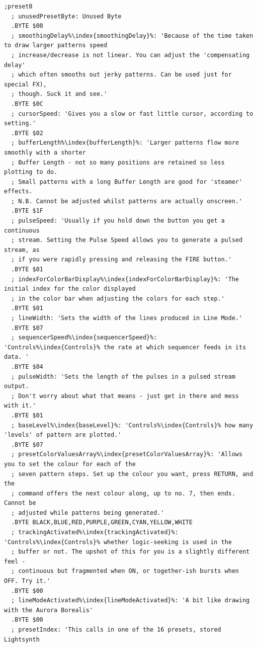 \begin{lstlisting}[basicstyle=\ttfamily\scriptsize,caption=Data structure for Preset 0.,escapechar=\%]
;preset0
  ; unusedPresetByte: Unused Byte
  .BYTE $00
  ; smoothingDelay%\index{smoothingDelay}%: 'Because of the time taken to draw larger patterns speed
  ; increase/decrease is not linear. You can adjust the 'compensating delay'
  ; which often smooths out jerky patterns. Can be used just for special FX),
  ; though. Suck it and see.'
  .BYTE $0C
  ; cursorSpeed: 'Gives you a slow or fast little cursor, according to setting.'
  .BYTE $02
  ; bufferLength%\index{bufferLength}%: 'Larger patterns flow more smoothly with a shorter
  ; Buffer Length - not so many positions are retained so less plotting to do.
  ; Small patterns with a long Buffer Length are good for 'steamer' effects.
  ; N.B. Cannot be adjusted whilst patterns are actually onscreen.'
  .BYTE $1F
  ; pulseSpeed: 'Usually if you hold down the button you get a continuous
  ; stream. Setting the Pulse Speed allows you to generate a pulsed stream, as
  ; if you were rapidly pressing and releasing the FIRE button.'
  .BYTE $01
  ; indexForColorBarDisplay%\index{indexForColorBarDisplay}%: 'The initial index for the color displayed
  ; in the color bar when adjusting the colors for each step.'
  .BYTE $01
  ; lineWidth: 'Sets the width of the lines produced in Line Mode.'
  .BYTE $07
  ; sequencerSpeed%\index{sequencerSpeed}%: 'Controls%\index{Controls}% the rate at which sequencer feeds in its data. '
  .BYTE $04
  ; pulseWidth: 'Sets the length of the pulses in a pulsed stream output.
  ; Don't worry about what that means - just get in there and mess with it.'
  .BYTE $01
  ; baseLevel%\index{baseLevel}%: 'Controls%\index{Controls}% how many 'levels' of pattern are plotted.'
  .BYTE $07
  ; presetColorValuesArray%\index{presetColorValuesArray}%: 'Allows you to set the colour for each of the
  ; seven pattern steps. Set up the colour you want, press RETURN, and the
  ; command offers the next colour along, up to no. 7, then ends. Cannot be
  ; adjusted while patterns being generated.'
  .BYTE BLACK,BLUE,RED,PURPLE,GREEN,CYAN,YELLOW,WHITE
  ; trackingActivated%\index{trackingActivated}%: 'Controls%\index{Controls}% whether logic-seeking is used in the
  ; buffer or not. The upshot of this for you is a slightly different feel -
  ; continuous but fragmented when ON, or together-ish bursts when OFF. Try it.'
  .BYTE $00
  ; lineModeActivated%\index{lineModeActivated}%: 'A bit like drawing with the Aurora Borealis'
  .BYTE $00
  ; presetIndex: 'This calls in one of the 16 presets, stored Lightsynth

\end{lstlisting}
